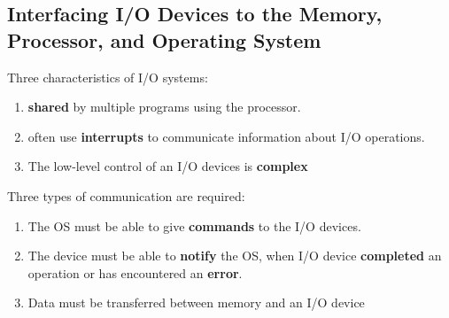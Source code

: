 

    



\subsection{Interfacing I/O Devices to the Memory, Processor, and Operating System}
Three characteristics of I/O systems: 
\begin{enumerate}\small
    \item \textbf{shared} by multiple programs using the processor.
    \item often use \textbf{interrupts} to communicate information about I/O operations.
    \item The low-level control of an I/O devices is \textbf{complex}
\end{enumerate}

Three types of communication are required:
\begin{enumerate}\small
    \item The OS must be able to give \textbf{commands} to the I/O devices.
    \item The device must be able to \textbf{notify} the OS, when I/O device
    \textbf{completed} an operation or has encountered an \textbf{error}.
    \item Data must be transferred between memory and an I/O device
\end{enumerate}

